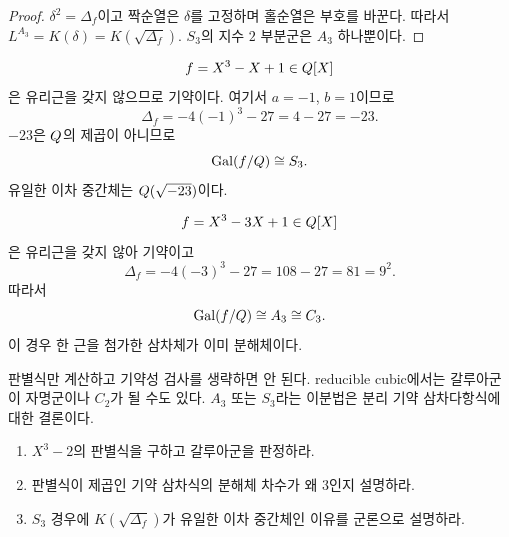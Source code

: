 \begin{proof}
$\delta^2=\Delta_f$이고 짝순열은 $\delta$를 고정하며 홀순열은 부호를 바꾼다. 따라서 $L^{A_3}=K(\delta)=K(\sqrt{\Delta_f})$. $S_3$의 지수 $2$ 부분군은 $A_3$ 하나뿐이다.
\end{proof}

\begin{example}
\[
  f=X^3-X+1\in Q[X]
\]
은 유리근을 갖지 않으므로 기약이다. 여기서 $a=-1$, $b=1$이므로
\[
  \Delta_f=-4(-1)^3-27=4-27=-23.
\]
$-23$은 $Q$의 제곱이 아니므로
\[
  \operatorname{Gal}(f/Q)\cong S_3.
\]
유일한 이차 중간체는 $Q(\sqrt{-23})$이다.
\end{example}

\begin{example}
\[
  f=X^3-3X+1\in Q[X]
\]
은 유리근을 갖지 않아 기약이고
\[
  \Delta_f=-4(-3)^3-27=108-27=81=9^2.
\]
따라서
\[
  \operatorname{Gal}(f/Q)\cong A_3\cong C_3.
\]
이 경우 한 근을 첨가한 삼차체가 이미 분해체이다.
\end{example}

\begin{pitfall}
판별식만 계산하고 기약성 검사를 생략하면 안 된다. reducible cubic에서는 갈루아군이 자명군이나 $C_2$가 될 수도 있다. $A_3$ 또는 $S_3$라는 이분법은 분리 기약 삼차다항식에 대한 결론이다.
\end{pitfall}

\begin{checkpoint}
\begin{enumerate}[label=(\alph*)]
  \item $X^3-2$의 판별식을 구하고 갈루아군을 판정하라.
  \item 판별식이 제곱인 기약 삼차식의 분해체 차수가 왜 $3$인지 설명하라.
  \item $S_3$ 경우에 $K(\sqrt{\Delta_f})$가 유일한 이차 중간체인 이유를 군론으로 설명하라.
\end{enumerate}
\end{checkpoint}
